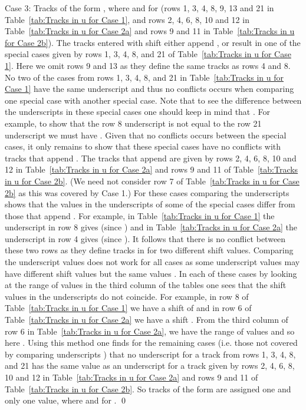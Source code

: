 \documentclass[11pt]{article} \usepackage{amsfonts,amsmath,amssymb,amsthm}
\renewenvironment{proof}{{\bfseries\noindent Proof.}}{\qed\vspace{3.5ex}}
\begin{document}
\begin{proof}
Case 3: Tracks of the form , where  and  for  (rows 1, 3, 4, 8, 9, 13 and 21 in Table~\ref{tab:Tracks in u for Case 1}, and rows 2, 4, 6, 8, 10 and 12 in Table~\ref{tab:Tracks in u for Case 2a} and rows 9 and 11 in Table~\ref{tab:Tracks in u for Case 2b}). The  tracks entered with shift   either append , or result in one of the special cases given by rows 1, 3, 4, 8, and 21 of Table~\ref{tab:Tracks in u for Case 1}. 
Here we omit rows 9 and 13 as they define the same tracks as rows 4 and 8. 
No two of the cases from rows 1, 3, 4, 8, and 21 in Table~\ref{tab:Tracks in u for Case 1} have the same underscript and thus no conflicts occurs when comparing one special case with another special case. 
Note that to see the difference between the underscripts in these special cases one should keep in mind that . For example, to show that the row 8 underscript  is not equal to the row 21 underscript  we must have .
Given that no conflicts occurs between the special cases, it only remains to show that these special cases have no conflicts with tracks that append . 
The  tracks that append  are given by rows 2, 4, 6, 8, 10 and 12 in Table~\ref{tab:Tracks in u for Case 2a} and rows 9 and 11 of Table~\ref{tab:Tracks in u for Case 2b}. 
(We need not consider row 7 of Table~\ref{tab:Tracks in u for Case 2b} as this was covered by Case 1.) 
For these cases comparing the underscripts  shows that the values in the underscripts of some of the special cases differ from those that append . 
For example, in Table~\ref{tab:Tracks in u for Case 1} the underscript in row 8 gives  (since ) and in Table~\ref{tab:Tracks in u for Case 2a} the underscript in row 4 gives  (since ). 
It follows that there is no conflict between these two rows as they define tracks in  for two different shift values. 
Comparing the underscript values  does not work for all cases as some underscript values may have different shift values but the same values . 
In each of these cases by looking at the range of values in the third column of the tables one sees that the shift values in the underscripts do not coincide. 
For example, in row 8 of Table~\ref{tab:Tracks in u for Case 1} we have a shift of  and in row 6 of Table~\ref{tab:Tracks in u for Case 2a} we have a shift . 
From the third column of row 6 in Table~\ref{tab:Tracks in u for Case 2a}, we have the range of values  and so here .
Using this method one finds for the remaining cases (i.e. those not covered by comparing underscripts ) that no underscript for a  track from rows 1, 3, 4, 8, and 21 has the same value as an underscript for a  track given by rows 2, 4, 6, 8, 10 and 12 in Table~\ref{tab:Tracks in u for Case 2a} and rows 9 and 11 of Table~\ref{tab:Tracks in u for Case 2b}.
So tracks of the form  are assigned one and only one value, where  and  for .
\end{proof}
\end{document}
